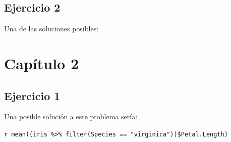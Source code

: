 \documentclass[]{book}
\newenvironment{Shaded}{\begin{snugshade}}{\end{snugshade}}
\newcommand{\DataTypeTok}[1]{\textcolor[rgb]{0.13,0.29,0.53}{#1}}
\newcommand{\DecValTok}[1]{\textcolor[rgb]{0.00,0.00,0.81}{#1}}
\newcommand{\FloatTok}[1]{\textcolor[rgb]{0.00,0.00,0.81}{#1}}
\newcommand{\KeywordTok}[1]{\textcolor[rgb]{0.13,0.29,0.53}{\textbf{#1}}}
\newcommand{\NormalTok}[1]{#1}
\newcommand{\OperatorTok}[1]{\textcolor[rgb]{0.81,0.36,0.00}{\textbf{#1}}}
\newcommand{\OtherTok}[1]{\textcolor[rgb]{0.56,0.35,0.01}{#1}}
\newcommand{\StringTok}[1]{\textcolor[rgb]{0.31,0.60,0.02}{#1}}
\begin{document}
\begin{Shaded}
\end{Shaded}

\hypertarget{ejercicio-2-2}{%
\subsection{Ejercicio 2}\label{ejercicio-2-2}}

Una de las soluciones posibles:

\begin{Shaded}
\end{Shaded}

\hypertarget{capitulo-2}{%
\section{Capítulo 2}\label{capitulo-2}}

\hypertarget{ejercicio-1-4}{%
\subsection{Ejercicio 1}\label{ejercicio-1-4}}

Una posible solución a este problema sería:

\texttt{\textasciigrave{}r\ mean((iris\ \%\textgreater{}\%\ filter(Species\ ==\ "virginica"))\$Petal.Length)\textasciigrave{}}
\end{document}
